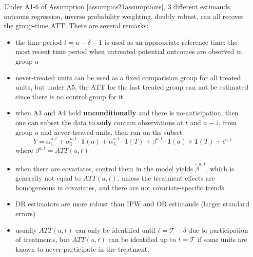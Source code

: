 \documentclass[twoside]{article}
\begin{document}
Under A1-6 of Assumption \ref{assump:cs21assumptions}, 3 different estimands, outcome regression, inverse probability weighting, doubly robust, can all recover the group-time ATT.
There are several remarks:
\begin{itemize}
    \item the time period $t=a-\delta -1$ is used as an appropriate reference time: the most recent time period when untreated potential outcomes are observed in group $a$
    \item never-treated units can be used as a fixed comparision group for all treated units, but under A5, the ATT for the last treated group can not be estimated since there is no control group for it.
    \item when A3 and A4 hold \textbf{unconditionally} and there is no-anticipation, then one can subset the data to \textbf{only} contain observations at $t$ and $a-1$, from group $a$ and never-treated units, then run on ths subset $$ Y =\alpha_1^{a,t}+\alpha_2^{a,t}\cdot \mathbf{1}(a) + \alpha^{a,t}_3 \cdot \mathbf{1}(T) + \beta^{a,t}\cdot \mathbf{1}(a)\times \mathbf{1}(T) + \epsilon^{a,t} $$ where $\beta^{a,t} = ATT(a,t)$
    \item when there are covariates, control them in the model yields $\tilde{\beta}^{a,t}$, which is generally not equal to $ATT(a,t)$, unless the treatment effects are homogeneous in covariates, and there are not covariate-specific trends 
    \item DR estimators are more robust than IPW and OR estimands (larger standard errors)
    \item usually $ATT(a,t)$ can only be identified until $t=\mathcal{T}-\delta$ due to participation of treatments, but $ATT(a,t)$ can be identified up to $t=\mathcal{T}$ if some units are known to never participate in the treatment.
\end{itemize}
\end{document}
